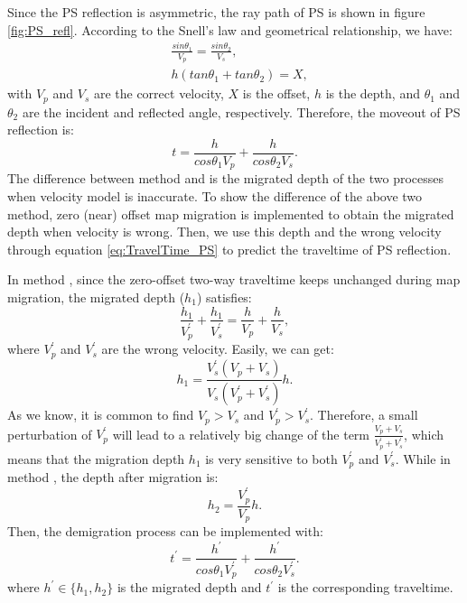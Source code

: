Since the PS reflection is asymmetric, the ray path of PS is shown in figure \ref{fig:PS_refl}.
According to the Snell's law and geometrical relationship, we have:
\begin{equation}
\begin{split}
    &\frac{sin\theta_1}{V_p}=\frac{sin\theta_2}{V_s},\\
	&h(tan\theta_1+tan\theta_2)=X,
\end{split}
    \label{eq:Snell_PS} 
\end{equation}
with $V_p$ and $V_s$ are the correct velocity, $X$ is the offset, $h$ is the depth, 
and $\theta_1$ and $\theta_2$ are the incident and reflected angle, respectively.
Therefore, the moveout of PS reflection is:
\begin{equation}
	t=\frac{h}{cos\theta_1V_p}+\frac{h}{cos\theta_2V_s}.
    \label{eq:TravelTime_PS} 
\end{equation}
The difference between method {\bf\uppercase\expandafter{}} and {\bf\uppercase\expandafter{}} 
is the migrated depth of the two processes when velocity model is inaccurate. 
To show the difference of the above two method, zero (near) offset map migration is implemented
to obtain the migrated depth when velocity is wrong. Then, we use this depth and the
wrong velocity through equation \eqref{eq:TravelTime_PS} to predict the traveltime of PS reflection.

In method {\bf\uppercase\expandafter{}}, since the zero-offset two-way traveltime
keeps unchanged during map migration, the migrated depth ($h_{1}$) satisfies:
\begin{equation}
	\frac{h_{1}}{V^{'}_p}+\frac{h_{1}}{V^{'}_s}=\frac{h}{V_p}+\frac{h}{V_s},
	\label{eq:Mapmigration_PS} 
\end{equation}
where $V^{'}_p$ and $V^{'}_s$ are the wrong velocity. Easily, we can get:
\begin{equation}
	{h_{1}}=\frac{V^{'}_s(V_p+V_s)}{V_s(V^{'}_p+V^{'}_s)}h.
    \label{eq:ZerooffMig_PS} 
\end{equation}
As we know, it is common to find $V_p>V_s$ and $V^{'}_p>V^{'}_s$. Therefore, a small perturbation of
$V^{'}_p$ will lead to a relatively big change of the term $\frac{V_p+V_s}{V^{'}_p+V^{'}_s}$, which
means that the migration depth $h_{1}$ is very sensitive to both $V^{'}_p$ and $V^{'}_s$. 
While in method \uppercase\expandafter{}, the depth after migration is: 
\begin{equation}
	{h_{2}}=\frac{V^{'}_p}{V_p}h.
    \label{eq:ZerooffMig_PP} 
\end{equation}
Then, the demigration process can be implemented with:
\begin{equation}
	t^{'}=\frac{h^{'}}{cos\theta_1V^{'}_p}+\frac{h^{'}}{cos\theta_2V^{'}_s}.
    \label{eq:Demigration_PS} 
\end{equation}
where $h^{'}\in\{h_1,h_2\}$ is the migrated depth and $t^{'}$ is the corresponding traveltime.

